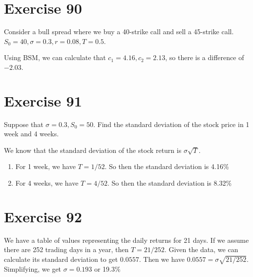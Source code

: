 \documentclass{article}
\begin{document}
\section*{Exercise 90}
Consider a bull spread where we buy a 40-strike call and sell a 45-strike call. $S_0 = 40, \sigma = 0.3, r = 0.08, T = 0.5$.
\begin{flushleft}
    Using BSM, we can calculate that $c_1 = 4.16, c_2 = 2.13$, so there is a difference of $-2.03$.
    \begin{center}
    \end{center}
\end{flushleft}

\section*{Exercise 91}
Suppose that $\sigma = 0.3, S_0 = 50$. Find the standard deviation of the stock price in 1 week and 4 weeks.
\begin{flushleft}
    We know that the standard deviation of the stock return is $\sigma \sqrt{T}$.
    \begin{enumerate}
        \item For 1 week, we have $T = 1/52$. So then the standard deviation is 4.16\%
        \item For 4 weeks, we have $T = 4/52$. So then the standard deviation is 8.32\%
    \end{enumerate}
\end{flushleft}

\section*{Exercise 92}
We have a table of values representing the daily returns for 21 days. If we assume there are 252 trading days in a year, then $T = 21/252$. Given the data, we can calculate its standard deviation to get $0.0557$. Then we have
$0.0557 = \sigma \sqrt{21/252}$. Simplifying, we get $\sigma = 0.193$ or 19.3\%
\end{document}
